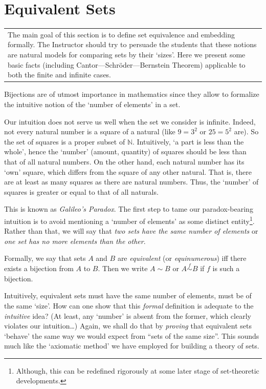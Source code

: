 \documentclass[12pt,notitlepage]{article}
\theoremstyle{plain}
\theoremstyle{definition}
\theoremstyle{plain}
\newcommand{\N}{\mathbb{N}}
\newcommand{\1}{\mathbf{1}}
\newcommand{\0}{\mathbf{0}}
\newcommand{\mcomm}[1]{
\medskip\noindent\begin{tabular}{| l}
\parbox{0.99\textwidth}{{\small
#1 }}\end{tabular}
\smallskip}
\begin{document}
\newpage
\section{Equivalent Sets}
\mcomm{The main goal of this section is to define set equivalence and embedding formally. The Instructor should try to persuade the students that these notions are natural models for comparing sets by their `sizes'. Here we present some basic facts (including Cantor---Schr\"{o}der---Bernstein Theorem) applicable to both the finite and infinite cases.}

Bijections are of utmost importance in mathematics since they allow to formalize the intuitive notion of the `number of elements' in a set.

Our intuition does not serve us well when the set we consider is infinite. Indeed, not every natural number is a square of a natural (like $9 = 3^2$ or $25 = 5^2$ are). So the set of squares is a proper subset of $\N$. Intuitively, `a part is less than the whole', hence the `number' (amount, quantity) of squares should be less than that of all natural numbers. On the other hand, each natural number has its `own' square, which differs from the square of any other natural. That is, there are at least as many squares as there are natural numbers. Thus, the `number' of squares is greater or equal to that of all naturals.

This is known as \emph{Galileo's Paradox}. The first step to tame our paradox-bearing intuition is to avoid  mentioning a `number of elements' as some distinct entity\footnote{Although, this can be redefined rigorously at some later stage of set-theoretic developments.}. Rather than that, we will say that \emph{two sets have the same number of elements} or \emph{one set has no more elements than the other}.

Formally, we say that sets $A$ and $B$ are \emph{equivalent} (or \emph{equinumerous}) iff there exists a bijection from $A$ to $B$. Then we write $A \sim B$ or $A \stackrel{f}{\sim} B$ if $f$ is such a bijection.

Intuitively, equivalent sets must have the same number of elements, must be of the same `size'. How can one show that this \emph{formal} definition is adequate to the \emph{intuitive} idea? (At least, any `number' is absent from the former, which clearly violates our intuition\dots) Again, we shall do that by \emph{proving} that equivalent sets `behave' the same way we would expect from ``sets of the same size''. This sounds much like the `axiomatic method' we have employed for building a theory of sets.
\end{document}
